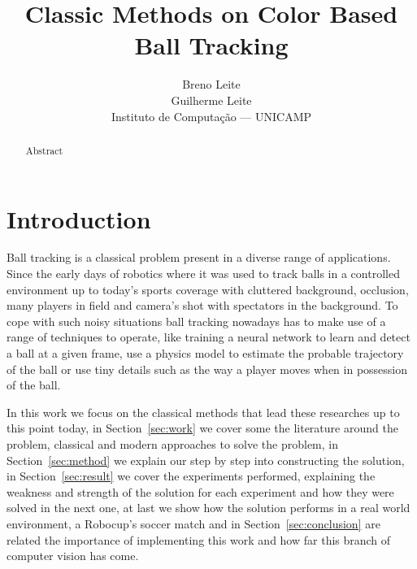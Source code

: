 \documentclass[10pt,twocolumn,letterpaper]{article}
\begin{document}
\title{Classic Methods on Color Based Ball Tracking}

\author{Breno Leite\\ Guilherme Leite\\
Instituto de Computa\c{c}\~ao --- UNICAMP\\
}

\maketitle

\begin{abstract}
  Abstract
\end{abstract}

\section{Introduction}\label{sec:intro}

Ball tracking is a classical problem present in a diverse range of
applications. Since the early days of robotics where it was used to track
balls in a controlled environment up to today's sports coverage with cluttered
background, occlusion, many players in field and camera's shot with spectators
in the background. To cope with such noisy situations ball tracking nowadays
has to make use of a range of techniques to operate, like training a neural
network to learn and detect a ball at a given frame, use a physics model to
estimate the probable trajectory of the ball or use tiny details such as the
way a player moves when in possession of the ball.

In this work we focus on the classical methods that lead these researches up
to this point today, in Section~\ref{sec:work} we cover some the literature
around the problem, classical and modern approaches to solve the problem, in
Section~\ref{sec:method} we explain our step by step into constructing the
solution, in Section~\ref{sec:result} we cover the experiments performed,
explaining the weakness and strength of the solution for each experiment and
how they were solved in the next one, at last we show how the solution
performs in a real world environment, a Robocup's soccer match and in
Section~\ref{sec:conclusion} are related the importance of implementing this
work and how far this branch of computer vision has come.

\end{document}
